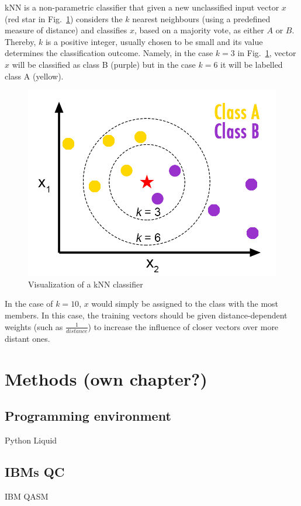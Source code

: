 kNN is a non-parametric classifier that given a new unclassified input vector $x$ (red star in Fig.~\ref{fig:knnconcept}) considers the $k$ nearest neighbours (using a predefined measure of distance) and classifies $x$, based on a majority vote, as either $A$ or $B$. Thereby, $k$ is a positive integer, usually chosen to be small and its value determines the classification outcome. Namely, in the case $k = 3$ in Fig.~\ref{fig:knnconcept}, vector $x$ will be classified as class B (purple) but in the case $k = 6$ it will be labelled class A (yellow).

\begin{figure}[!ht]
      \centering
       \includegraphics[scale=0.55]{img/knn-concept.png}
       \caption[caption for kNN]{\label{fig:knnconcept} Visualization of a kNN classifier\footnotemark[3]}
\end{figure}


In the case of $k = 10$, $x$ would simply be assigned to the class with the most members. In this case, the training vectors should be given distance-dependent weights (such as $\frac{1}{distance}$) to increase the influence of closer vectors over more distant ones.

\section{Methods (own chapter?)}
\label{subsec:methods}

\subsection{Programming environment}
\label{subsubsec:programming}

Python
Liquid

\subsection{IBMs QC}
\label{subsubsec:ibmqc}

IBM QASM